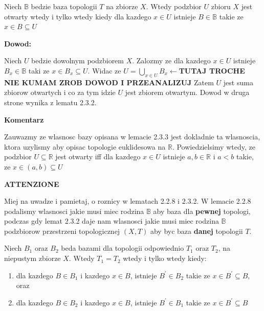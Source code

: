 \documentclass{article}
\begin{document}
\begin{tcolorbox}[colback=white!90!green,colframe=black!35!green,title=2.3.3 Lemat: Baza topologii podejscie 3?]

    Niech $\mathbb{B}$ bedzie baza topologii $T$ na zbiorze $X$. Wtedy podzbior $U$ zbioru $X$ jest otwarty wtedy i tylko wtedy kiedy dla kazdego $x \in U$ istnieje $B \in \mathbb{B}$ takie ze $x \in B \subseteq U$

\end{tcolorbox}

\textbf{Dowod:}

Niech $U$ bedzie dowolnym podzbiorem $X$. Zalozmy ze dla kazdego $x \in U$ istnieje $B_{x} \in \mathbb{B}$ taki ze $x \in B_{x} \subseteq U$. Widac ze $U = \bigcup\limits_{x \in U}B_{x}\leftarrow$\textbf{TUTAJ TROCHE NIE KUMAM ZROB DOWOD I PRZEANALIZUJ} Zatem $U$ jest suma zbiorow otwartych i co za tym idzie $U$ jest zbiorem otwartym. Dowod w druga strone wynika z lematu 2.3.2.

\textbf{Komentarz}

Zauwazmy ze wlasnosc bazy opisana w lemacie 2.3.3 jest dokladnie ta wlasnoscia, ktora uzylismy aby opisac topologie euklidesowa na $\mathbb{R}$. Powiedzielsimy wtedy, ze podzbior $U \subseteq \mathbb{R}$ jest otwarty iff dla kazdego $x \in U$ istnieje $a,b \in \mathbb{R}$ i $a<b$ takie, ze $x \in (a,b) \subseteq U$

\textbf{ATTENZIONE}

Miej na uwadze i pamietaj, o roznicy w lematach 2.2.8 i 2.3.2. W lemacie 2.2.8 podalismy wlasnosci jakie musi miec rodzina $\mathbb{B}$ aby baza dla \textbf{pewnej} topologi, podczas gdy lemat 2.3.2 daje nam wlasnosci jakie musi miec rodzina $\mathbb{B}$ podzbiorow przestrzeni topologicznej $(X,T)$ aby byc baza \textbf{danej} topologii $T$.

\begin{tcolorbox}[colback=white!90!green,colframe=black!35!green,title=2.3.4 Lemat: Bazy dla tej samej topologii]
    Niech $B_{1}$ oraz $B_{2}$ beda bazami dla topologii odpowiednio $T_{1}$ oraz $T_{2}$, na niepustym zbiorze $X$. Wtedy $T_{1} = T_{2}$ wtedy i tylko wtedy kiedy:
    \begin{enumerate}[label=(\alph*)]
        \item dla kazdego $B \in B_{1}$ i kazdego $x \in B$, istnieje $B^{\prime} \in B_{2}$ takie ze $x \in B^{\prime} \subseteq B$, oraz
        \item dla kazdego $B \in B_{2}$ i kazdego $x \in B$, istnieje $B^{\prime} \in B_{1}$ takie ze $x \in B^{\prime} \subseteq B$
    \end{enumerate}
\end{tcolorbox}
\end{document}
